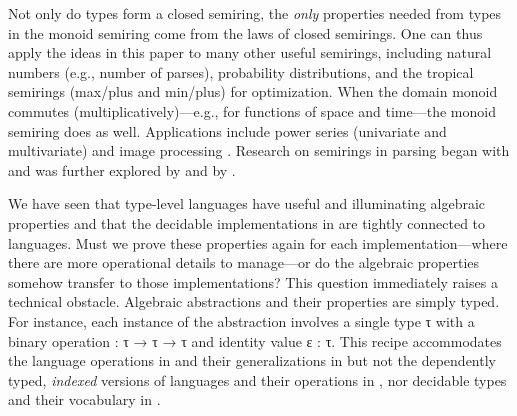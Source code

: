 \documentclass[acmsmall,screen,timestamp]{acmart}  %
\begin{document}
Not only do types form a closed semiring, the \emph{only} properties needed from types in the monoid semiring come from the laws of closed semirings.
One can thus apply the ideas in this paper to many other useful semirings, including natural numbers (e.g., number of parses), probability distributions, and the tropical semirings (max/plus and min/plus) for optimization.
When the domain monoid commutes (multiplicatively)---e.g., for functions of space and time---the monoid semiring does as well.
Applications include power series (univariate and multivariate) and image processing \citep{Elliott2019-convolution}.
Research on semirings in parsing began with \citet{Chomsky1959CFL} and was further explored by \citet{Goodman1998PIO, Goodman1999SP} and by \citet{Liu2004}.


\rnc{}

We have seen that type-level languages have useful and illuminating algebraic properties and that the decidable implementations in  are tightly connected to languages.
Must we prove these properties again for each implementation---where there are more operational details to manage---or do the algebraic properties somehow transfer to those implementations?
This question immediately raises a technical obstacle.
Algebraic abstractions and their properties are simply typed.
For instance, each instance of the  abstraction involves a single type \AB τ with a binary operation { \AK : \AB τ \AK → \AB τ \AK → \AB τ} and identity value {\AB ε \AK : \AB τ}.
This recipe accommodates the language operations in  and their generalizations in  but not the dependently typed, \emph{indexed} versions of languages and their operations in , nor decidable types and their vocabulary in .
\end{document}
